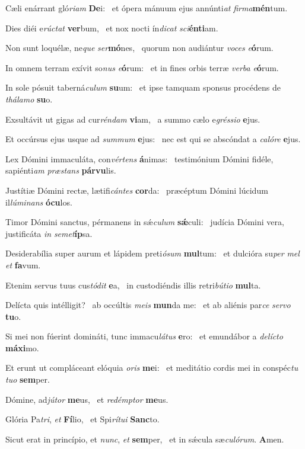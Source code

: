 \item Cæli enárrant gló\textit{riam} \textbf{De}i:~\psstar{} et ópera mánuum ejus annúnti\textit{at} \textit{firma}\textbf{mén}tum.
\item Dies diéi e\textit{rúctat} \textbf{ver}bum,~\psstar{} et nox nocti ín\textit{dicat} \textit{sci}\textbf{én}\textbf{ti}am.
\item Non sunt loquélæ, ne\textit{que} \textit{ser}\textbf{mó}nes,~\psstar{} quorum non audiántur \textit{voces} \textit{e}\textbf{ó}rum.
\item In omnem terram exívit so\textit{nus} \textit{e}\textbf{ó}rum:~\psstar{} et in fines orbis terræ \textit{verba} \textit{e}\textbf{ó}rum.
\item In sole pósuit taberná\textit{culum} \textbf{su}um:~\psstar{} et ipse tamquam sponsus procédens de \textit{thálamo} \textbf{su}o.
\item Exsultávit ut gigas ad cur\textit{réndam} \textbf{vi}am,~\psstar{} a summo cælo e\textit{gréssio} \textbf{e}jus.
\item Et occúrsus ejus usque ad \textit{summum} \textbf{e}jus:~\psstar{} nec est qui se abscóndat a \textit{calóre} \textbf{e}jus.
\item Lex Dómini immaculáta, con\textit{vértens} \textbf{á}nimas:~\psstar{} testimónium Dómini fidéle, sapiénti\textit{am} \textit{præstans} \textbf{pár}\textbf{vu}lis.
\item Justítiæ Dómini rectæ, lætifi\textit{cántes} \textbf{cor}da:~\psstar{} præcéptum Dómini lúcidum il\textit{lúminans} \textbf{ó}\textbf{cu}los.
\item Timor Dómini sanctus, pérmanens in sǽ\textit{culum} \textbf{sǽ}culi:~\psstar{} judícia Dómini vera, justificáta \textit{in} \textit{semet}\textbf{íp}sa.
\item Desiderabília super aurum et lápidem preti\textit{ósum} \textbf{mul}tum:~\psstar{} et dulcióra su\textit{per} \textit{mel} \textit{et} \textbf{fa}vum.
\item Etenim servus tuus cus\textit{tódit} \textbf{e}a,~\psstar{} in custodiéndis illis retri\textit{bútio} \textbf{mul}ta.
\item Delícta quis intélligit?~\pscross{} ab occúltis \textit{meis} \textbf{mun}da me:~\psstar{} et ab aliénis par\textit{ce} \textit{servo} \textbf{tu}o.
\item Si mei non fúerint domináti, tunc immacu\textit{látus} \textbf{e}ro:~\psstar{} et emundábor a \textit{delícto} \textbf{má}\textbf{xi}mo.
\item Et erunt ut compláceant elóquia \textit{oris} \textbf{me}i:~\psstar{} et meditátio cordis mei in conspéc\textit{tu} \textit{tuo} \textbf{sem}per.
\item Dómine, ad\textit{jútor} \textbf{me}us,~\psstar{} et \textit{redémptor} \textbf{me}us.
\item Glória Pa\textit{tri}, \textit{et} \textbf{Fí}lio,~\psstar{} et Spi\textit{rítui} \textbf{Sanc}to.
\item Sicut erat in princípio, et \textit{nunc}, \textit{et} \textbf{sem}per,~\psstar{} et in sǽcula sæ\textit{culórum}. \textbf{A}men.
